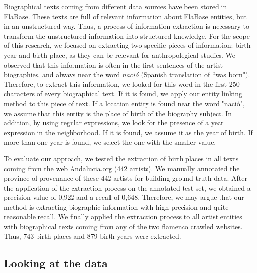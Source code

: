 Biographical texts coming from different data sources have been stored in FlaBase. These texts are full of relevant information about FlaBase entities, but in an unstructured way. Thus, a process of information extraction is necessary to transform the unstructured information into structured knowledge. For the scope of this research, we focused on extracting two specific pieces of information: birth year and birth place, as they can be relevant for anthropological studies. We observed that this information is often in the first sentences of the artist biographies, and always near the word \textit{naci\'{o}} (Spanish translation of ``was born"). Therefore, to extract this information, we looked for this word in the first 250 characters of every biographical text. If it is found, we apply our entity linking method to this piece of text. If a location entity is found near the word "naci\'{o}", we assume that this entity is the place of birth of the biography subject. In addition, by using regular expressions, we look for the presence of a year expression in the neighborhood. If it is found, we assume it as the year of birth. If more than one year is found, we select the one with the smaller value. 

To evaluate our approach, we tested the extraction of birth places in all texts coming from the web Andalucia.org (442 artists). %
We manually annotated the province of provenance of these 442 artists for building ground truth data. After the application of the extraction process on the annotated test set, we obtained a precision value of 0,922 and a recall of 0,648. Therefore, we may argue that our method is extracting biographic information with high precision and quite reasonable recall. 
We finally applied the extraction process to all artist entities with biographical texts coming from any of the two flamenco crawled websites. Thus, %
743 birth places and 879 birth years were extracted. 

\subsection{Looking at the data}
\label{sec:musicology:data-analysis}

